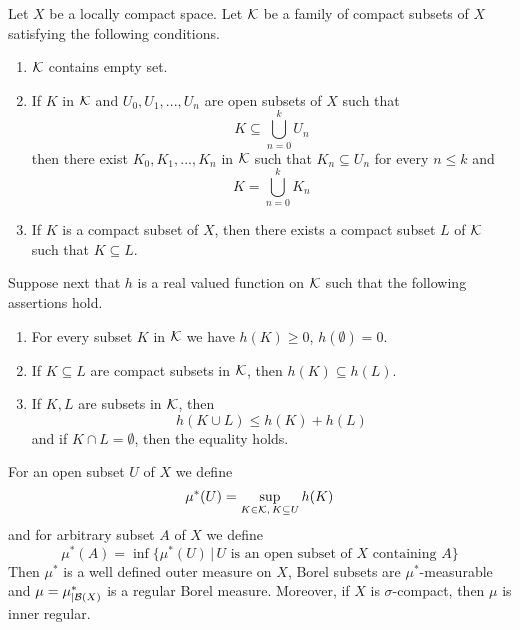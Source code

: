 \begin{theorem}\label{theorem:extensionofmeasureoncompactclass}
Let $X$ be a locally compact space. Let ${\mathcal K}$ be a family of compact subsets of $X$ satisfying the following conditions.
\begin{enumerate}[label=\emph{\textbf{(\arabic*)}}, leftmargin=1.5em]
\item ${\mathcal K}$ contains empty set.
\item If $K$ in ${\mathcal K}$ and $U_0,U_1,...,U_n$ are open subsets of $X$ such that
$$K\subseteq \bigcup_{n=0}^kU_n$$
then there exist $K_0,K_1,...,K_n$ in ${\mathcal K}$ such that $K_n\subseteq U_n$ for every $n\leq k$ and
$$K = \bigcup_{n=0}^kK_n$$
\item If $K$ is a compact subset of $X$, then there exists a compact subset $L$ of ${\mathcal K}$ such that $K\subseteq L$.
\end{enumerate}
Suppose next that $h$ is a real valued function on ${\mathcal K}$ such that the following assertions hold.
\begin{enumerate}[label=\emph{\textbf{(\arabic*)}}, leftmargin=1.5em]
\item For every subset $K$ in ${\mathcal K}$ we have $h(K)\geq 0$, $h(\emptyset) = 0$.
\item If $K\subseteq L$ are compact subsets in ${\mathcal K}$, then $h(K)\subseteq h(L)$.
\item If $K, L$ are subsets in ${\mathcal K}$, then
$$h(K\cup L) \leq h(K) + h(L)$$
and if $K \cap L = \emptyset$, then the equality holds.
\end{enumerate}
For an open subset $U$ of $X$ we define
$$\mu^*(U) = \sup_{K\in {\mathcal K},\,K\subseteq U}h(K)$$
and for arbitrary subset $A$ of $X$ we define
$$\mu^*(A) = \inf \big\{\mu^*(U)\,\big|\,U\mbox{ is an open subset of }X\mbox{ containing }A\big\}$$
Then $\mu^*$ is a well defined outer measure on $X$, Borel subsets are $\mu^*$-measurable and $\mu = \mu^*_{\mid {\mathcal B}(X)}$ is a regular Borel measure. Moreover, if $X$ is $\sigma$-compact, then $\mu$ is inner regular.
\end{theorem}
